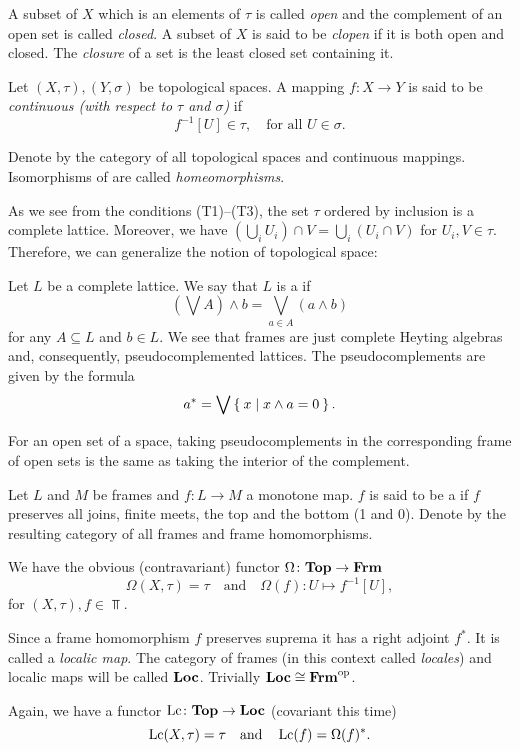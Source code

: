 A subset of $X$ which is an elements of $\tau$ is called \emph{open} and the complement of an open set is called \emph{closed}. A subset of $X$ is said to be \emph{clopen} if it is both open and closed.
The \emph{closure} of a set is the least closed set containing it.

Let $(X,\tau), (Y,\sigma)$ be topological spaces. A mapping $f\colon X\to Y$ is said to be \emph{continuous (with respect to $\tau$ and $\sigma$)} if
$$ f^{-1}[U] \in \tau,\quad\text{for all } U\in \sigma.$$

\noindent Denote by \Top{} the category of all topological spaces and continuous mappings. Isomorphisms of \Top{} are called \emph{homeomorphisms}.

As we see from the conditions (T1)--(T3), the set $\tau$ ordered by inclusion is a complete lattice. Moreover, we have $(\bigcup_i U_i)\cap V = \bigcup_i (U_i\cap V)$ for $U_i, V\in \tau$.
Therefore, we can generalize the notion of topological space:

Let $L$ be a complete lattice. We say that $L$ is a  if
$$ (\bigvee A)\wedge b = \bigvee_{a\in A} ( a\wedge b ) $$
for any $A\subseteq L$ and $b\in L$. We see that frames are just complete Heyting algebras and, consequently, pseudocomplemented lattices.
The pseudocomplements are given by the formula
$$ a^* = \bigvee \Set{ x | x\wedge a = 0}. $$

\noindent For an open set of a space, taking pseudocomplements in the corresponding frame of open sets is the same as taking the interior of the complement.

Let $L$ and $M$ be frames and $f\colon L\to M$ a monotone map. $f$ is said to be a  if $f$ preserves all joins, finite meets, the top and the bottom (1 and 0).
Denote by \Frm{} the resulting category of all frames and frame homomorphisms.

We have the obvious (contravariant) functor $\Omega\colon \mathbf{Top}\to \mathbf{Frm}$
$$ \Omega(X,\tau) = \tau\quad\text{and}\quad \Omega(f)\colon U\mapsto f^{-1}[U],$$
for $(X,\tau), f \in \Top$.

Since a frame homomorphism $f$ preserves suprema it has a right adjoint $f^*$. It is called a \emph{localic map}.
The category of frames (in this context called \emph{locales}) and localic maps will be called $\mathbf{Loc}$. Trivially $\mathbf{Loc}\cong\mathbf{Frm}^{\text{op}}$.

Again, we have a functor $\operatorname{Lc}\colon \mathbf{Top}\to \mathbf{Loc}$ (covariant this time)
$$ \operatorname{Lc}(X,\tau) = \tau\quad\text{and}\quad \operatorname{Lc}(f) = \Omega(f)^*.$$

